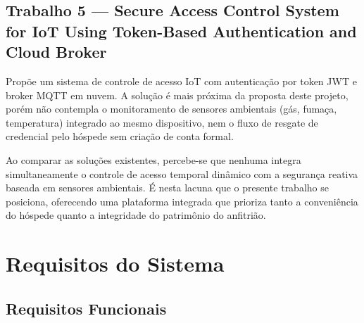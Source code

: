 \documentclass[12pt,a4paper]{article}
\begin{document}
\subsection*{Trabalho 5 — Secure Access Control System for IoT Using Token-Based Authentication
and Cloud Broker}

Propõe um sistema de controle de acesso IoT com autenticação por token JWT e broker
MQTT em nuvem. A solução é mais próxima da proposta deste projeto, porém não contempla
o monitoramento de sensores ambientais (gás, fumaça, temperatura) integrado ao mesmo
dispositivo, nem o fluxo de resgate de credencial pelo hóspede sem criação de conta
formal.

\bigskip
\noindent Ao comparar as soluções existentes, percebe-se que nenhuma integra
simultaneamente o controle de acesso temporal dinâmico com a segurança reativa baseada
em sensores ambientais. É nesta lacuna que o presente trabalho se posiciona, oferecendo
uma plataforma integrada que prioriza tanto a conveniência do hóspede quanto a
integridade do patrimônio do anfitrião.

\section{Requisitos do Sistema}

\subsection{Requisitos Funcionais}
\end{document}
